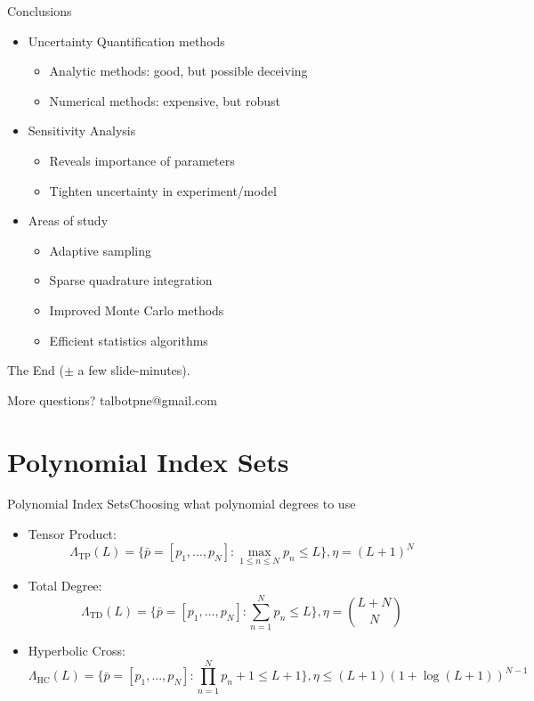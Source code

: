 \documentclass{beamer}
\begin{document}
\begin{frame}[label=conc]{Conclusions}\vspace{-20pt}
\begin{itemize}
\item Uncertainty Quantification methods
    \begin{itemize}
    \item Analytic methods: good, but possible deceiving
    \item Numerical methods: expensive, but robust
    \end{itemize}\vspace{10pt}
\item Sensitivity Analysis
    \begin{itemize}
    \item Reveals importance of parameters
    \item Tighten uncertainty in experiment/model
    \end{itemize}\vspace{10pt}
\item Areas of study
   \begin{itemize}
   \item Adaptive sampling
   \item Sparse quadrature integration
   \item Improved Monte Carlo methods
   \item Efficient statistics algorithms
   \end{itemize}
\end{itemize}
\end{frame}

\begin{frame}
The End ($\pm$ a few slide-minutes).\vspace{30pt}

More questions? talbotpne@gmail.com
\end{frame}

\appendix
\section{Polynomial Index Sets}
\begin{frame}{Polynomial Index Sets}{Choosing what polynomial degrees to use}\vspace{-20pt}
\begin{itemize}
\item Tensor Product:\scriptsize\[\Lambda_\text{TP}(L)=\Big\{\bar p=[p_1,...,p_N]: \max_{1\leq n\leq N}p_n\leq L \Big\},\eta=(L+1)^N\]\normalsize
\item Total Degree: \scriptsize\[\Lambda_\text{TD}(L)=\Big\{\bar p=[p_1,...,p_N]:\sum_{n=1}^N p_n \leq L \Big\},\eta={L+N\choose N}\]\normalsize
\item Hyperbolic Cross: \scriptsize\[\Lambda_\text{HC}(L)=\Big\{\bar p=[p_1,...,p_N]:\prod_{n=1}^N p_n+1 \leq L+1 \Big\},\eta\leq (L+1)(1+\log(L+1))^{N-1}\]
\end{itemize}
\end{frame}
\end{document}
